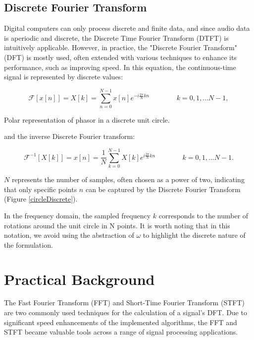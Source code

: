 \subsection{Discrete Fourier Transform}
Digital computers can only process discrete and finite data, and since audio data is aperiodic and discrete, the Discrete Time Fourier Transform (DTFT) is intuitively applicable. However, in practice, the "Discrete Fourier Transform" (DFT) is mostly used, often extended with various techniques to enhance its performance, such as improving speed. In this equation, the continuous-time signal is represented by discrete values:

\begin{equation}
    \mathcal {F}[x[n]] = X[k] = \sum^{N-1}_{n=0} x[n]e^{-i \frac{2 \pi }{N}k n} 
  \; \; \; \; \; \; \; \; \; \; \; \; \; \;
  k = 0, 1, ... N-1,
\end{equation}

\begin{marginfigure}
\centering

\caption{Polar representation of phasor in a discrete unit circle.}
\label{circleDiscrete} \vspace{3cm}
\end{marginfigure}

and the inverse Discrete Fourier transform:

\begin{equation}
        \mathcal {F}^{-1}[X[k]] = x[n] = \frac{1}{N} \sum^{N-1}_{k=0} X[k]e^{i \frac{2 \pi }{N}k n} 
  \; \; \; \; \; \; \; \; \; \; \; \; \; \;
  k = 0, 1, ... N-1.
\end{equation}

$N$ represents the number of samples, often chosen as a power of two, indicating that only specific points $n$ can be captured by the Discrete Fourier Transform (Figure \ref{circleDiscrete}).

In the frequency domain, the sampled frequency $k$ corresponds to the number of rotations around the unit circle in N points. It is worth noting that in this notation, we avoid using the abstraction of $\omega$ to highlight the discrete nature of the formulation.



\section{Practical Background}
The Fast Fourier Transform (FFT) and Short-Time Fourier Transform (STFT) are two commonly used techniques for the calculation of a signal's DFT.
Due to significant speed enhancements of the implemented algorithms, the FFT and STFT became valuable tools across a range of signal processing applications.

